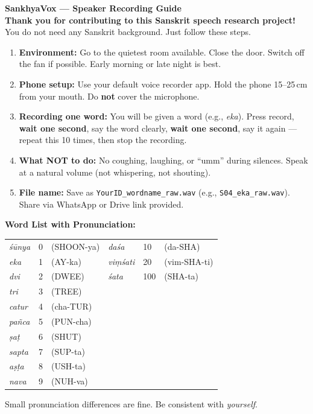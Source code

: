 \documentclass[12pt,a4paper]{article}
\begin{document}
\begin{mdframed}[linewidth=1pt, linecolor=saffron, topline=true,
                 backgroundcolor=lightgray]
\textbf{\large SankhyaVox --- Speaker Recording Guide}\\[4pt]
\textbf{Thank you for contributing to this Sanskrit speech research project!}
You do not need any Sanskrit background. Just follow these steps.

\begin{enumerate}[leftmargin=1.5em, itemsep=3pt]
  \item \textbf{Environment:} Go to the quietest room available.
        Close the door. Switch off the fan if possible.
        Early morning or late night is best.

  \item \textbf{Phone setup:} Use your default voice recorder app.
        Hold the phone 15--25\,cm from your mouth.
        Do \textbf{not} cover the microphone.

  \item \textbf{Recording one word:} You will be given a word (e.g., \textit{eka}).
        Press record, \textbf{wait one second}, say the word clearly,
        \textbf{wait one second}, say it again --- repeat this 10 times,
        then stop the recording.

  \item \textbf{What NOT to do:} No coughing, laughing, or ``umm'' during
        silences. Speak at a natural volume (not whispering, not shouting).

  \item \textbf{File name:} Save as \texttt{YourID\_wordname\_raw.wav}
        (e.g., \texttt{S04\_eka\_raw.wav}).
        Share via WhatsApp or Drive link provided.
\end{enumerate}

\textbf{Word List with Pronunciation:}
\begin{center}
\small
\begin{tabular}{lll|lll}
\textit{\'{s}\={u}nya} & 0 & (SHOON-ya) &
\textit{da\'{s}a}   & 10 & (da-SHA) \\
\textit{eka}   & 1 & (AY-ka)  &
\textit{vi\d{m}\'{s}ati} & 20 & (vim-SHA-ti) \\
\textit{dvi}   & 2 & (DWEE)   &
\textit{\'{s}ata} & 100 & (SHA-ta) \\
\textit{tri}   & 3 & (TREE)   & & & \\
\textit{catur} & 4 & (cha-TUR) & & & \\
\textit{pa\~{n}ca} & 5 & (PUN-cha) & & & \\
\textit{\d{s}a\d{t}} & 6 & (SHUT) & & & \\
\textit{sapta} & 7 & (SUP-ta) & & & \\
\textit{a\d{s}\d{t}a} & 8 & (USH-ta) & & & \\
\textit{nava}  & 9 & (NUH-va) & & & \\
\end{tabular}
\end{center}
Small pronunciation differences are fine. Be consistent with \emph{yourself}.
\end{mdframed}
\end{document}
